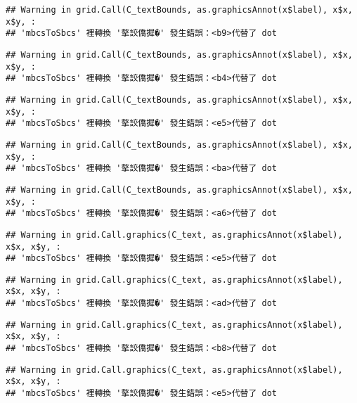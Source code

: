 \documentclass[
]{article}
\begin{document}
\begin{verbatim}
## Warning in grid.Call(C_textBounds, as.graphicsAnnot(x$label), x$x, x$y, :
## 'mbcsToSbcs' 裡轉換 '摮詨僑摨�' 發生錯誤：<b9>代替了 dot
\end{verbatim}

\begin{verbatim}
## Warning in grid.Call(C_textBounds, as.graphicsAnnot(x$label), x$x, x$y, :
## 'mbcsToSbcs' 裡轉換 '摮詨僑摨�' 發生錯誤：<b4>代替了 dot
\end{verbatim}

\begin{verbatim}
## Warning in grid.Call(C_textBounds, as.graphicsAnnot(x$label), x$x, x$y, :
## 'mbcsToSbcs' 裡轉換 '摮詨僑摨�' 發生錯誤：<e5>代替了 dot
\end{verbatim}

\begin{verbatim}
## Warning in grid.Call(C_textBounds, as.graphicsAnnot(x$label), x$x, x$y, :
## 'mbcsToSbcs' 裡轉換 '摮詨僑摨�' 發生錯誤：<ba>代替了 dot
\end{verbatim}

\begin{verbatim}
## Warning in grid.Call(C_textBounds, as.graphicsAnnot(x$label), x$x, x$y, :
## 'mbcsToSbcs' 裡轉換 '摮詨僑摨�' 發生錯誤：<a6>代替了 dot
\end{verbatim}

\begin{verbatim}
## Warning in grid.Call.graphics(C_text, as.graphicsAnnot(x$label), x$x, x$y, :
## 'mbcsToSbcs' 裡轉換 '摮詨僑摨�' 發生錯誤：<e5>代替了 dot
\end{verbatim}

\begin{verbatim}
## Warning in grid.Call.graphics(C_text, as.graphicsAnnot(x$label), x$x, x$y, :
## 'mbcsToSbcs' 裡轉換 '摮詨僑摨�' 發生錯誤：<ad>代替了 dot
\end{verbatim}

\begin{verbatim}
## Warning in grid.Call.graphics(C_text, as.graphicsAnnot(x$label), x$x, x$y, :
## 'mbcsToSbcs' 裡轉換 '摮詨僑摨�' 發生錯誤：<b8>代替了 dot
\end{verbatim}

\begin{verbatim}
## Warning in grid.Call.graphics(C_text, as.graphicsAnnot(x$label), x$x, x$y, :
## 'mbcsToSbcs' 裡轉換 '摮詨僑摨�' 發生錯誤：<e5>代替了 dot
\end{verbatim}
\end{document}
